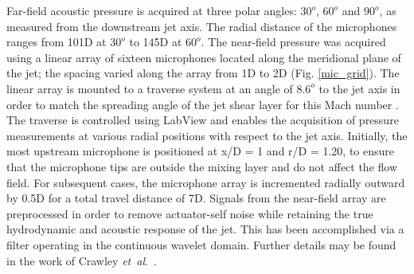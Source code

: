 \documentclass[english]{aiaa-tc}
\newcommand*{\etal}{\textit{et~al}.\ }
\begin{document}
Far-field acoustic pressure is acquired at three polar angles: $30^{o}$, $60^{o}$ and $90^{o}$, as measured from the downstream jet axis.
The radial distance of the microphones ranges from 101D at $30^{o}$ to 145D at $60^{o}$.
The near-field pressure was acquired using a linear array of sixteen microphones located along the meridional plane of the jet; the spacing varied along the array from 1D to 2D (Fig. \ref{mic_grid}).
The linear array is mounted to a traverse system at an angle of $8.6^{o}$ to the jet axis in order to match the spreading angle of the jet shear layer for this Mach number \cite{kfm2009-1}.
The traverse is controlled using LabView and enables the acquisition of pressure measurements at various radial positions with respect to the jet axis.
Initially, the most upstream microphone is positioned at x/D = 1 and r/D = 1.20, to ensure that the microphone tips are outside the mixing layer and do not affect the flow field.
For subsequent cases, the microphone array is incremented radially outward by 0.5D for a total travel distance of 7D.
Signals from the near-field array are preprocessed in order to remove actuator-self noise while retaining the true hydrodynamic and acoustic response of the jet.
This has been accomplished via a filter operating in the continuous wavelet domain. Further details may be found in the work of Crawley \etal \cite{Crawley2015}.
\end{document}
